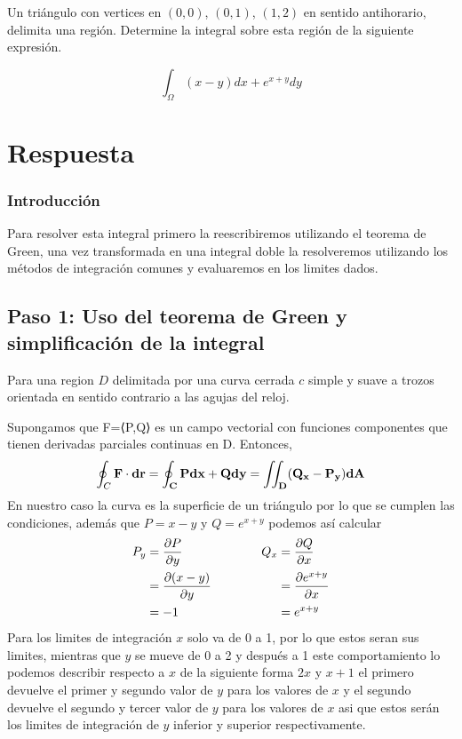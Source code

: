 \item Un triángulo con vertices en $(0,0)$, $(0,1)$, $(1,2)$ en sentido antihorario, delimita una región.
    Determine la integral sobre esta región de la siguiente expresión.
    \begin{LARGE}
        \begin{equation*}
            \int_\Omega (x - y)dx + e^{x+y}dy
        \end{equation*}
    \end{LARGE}
\section*{Respuesta}
    \subsubsection*{Introducción}
        Para resolver esta integral primero la reescribiremos utilizando el teorema de Green, una vez transformada en una integral doble
        la resolveremos utilizando los métodos de integración comunes y evaluaremos en los limites dados.
    \subsection*{Paso 1: Uso del teorema de Green y simplificación de la  integral}
        Para una region $D$ delimitada por una curva cerrada $c$ simple y suave a trozos orientada en sentido contrario a las agujas del reloj.

        Supongamos que F=⟨P,Q⟩ es un campo vectorial con funciones componentes que tienen derivadas parciales continuas en D. Entonces,
        \begin{equation*}
            \oint_C \bf{F}\cdot d\bf{r} = \oint_C P dx + Q dy = \iint_D (Q_x - P_y)dA
        \end{equation*}
        En nuestro caso la curva es la superficie de un triángulo por lo que se cumplen las condiciones, además que
        $P = x - y $ y $Q = e^{x + y} $ podemos así calcular
        \begin{align*}
            P_y & = \dfrac{\partial P}{\partial y} & Q_x & =  \dfrac{\partial Q}{\partial x} \\
            & = \dfrac{\partial (x - y)}{\partial y} & & =  \dfrac{\partial e^{x + y} }{\partial x} \\
            & = - 1 \hspace{2 cm} & & = e^{x + y}
        \end{align*}
        Para los limites de integración $x$ solo va de 0 a 1, por lo que estos seran sus limites, mientras que $y $ se mueve de 0 a 2 y después a 1
        este comportamiento lo podemos describir respecto a $x$ de la siguiente forma $2x$ y $x + 1$ el primero devuelve el primer y segundo valor de
        $y$ para los valores de $x$ y el segundo devuelve el segundo y tercer valor de $y$ para los valores de $x$ asi que estos serán los limites de
        integración de $y$ inferior y superior respectivamente.

